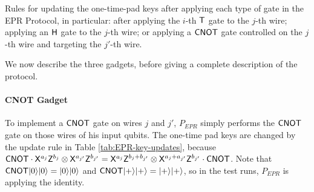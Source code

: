 \documentclass[11pt]{article}
\newcommand{\ket}[1]{|#1\rangle}
\begin{document}
\begin{table}[H]


\caption{Rules for updating the one-time-pad keys after applying each type of gate in the EPR Protocol, in particular: after applying the $i$-th $\sf T$ gate to the $j$-th wire; applying an $\sf H$ gate to the $j$-th wire; or applying a $\sf CNOT$ gate controlled on the $j$-th wire and targeting the $j'$-th wire. 
}\label{tab:EPR-key-updates}
\end{table}

We now describe the three gadgets, before giving a complete description of the protocol. 

\paragraph{CNOT Gadget} To implement a $\sf CNOT$ gate on wires $j$ and $j'$, $P_{EPR}$ simply performs the $\sf CNOT$ gate on those wires of his input qubits. The one-time pad keys are changed by the update rule in Table \ref{tab:EPR-key-updates}, because ${\sf CNOT}\cdot {\sf X}^{a_j}{\sf Z}^{b_j}\otimes {\sf X}^{a_{j'}}{\sf Z}^{b_{j'}}={\sf X}^{a_j}{\sf Z}^{b_j+b_{j'}}\otimes {\sf X}^{a_j+a_{j'}}{\sf Z}^{b_{j'}}\cdot {\sf CNOT}$. Note that ${\sf CNOT}\ket{0}\ket{0}=\ket{0}\ket{0}$ and ${\sf CNOT}\ket{+}\ket{+}=\ket{+}\ket{+}$, so in the test runs, $P_{EPR}$ is applying the identity. 
\end{document}
